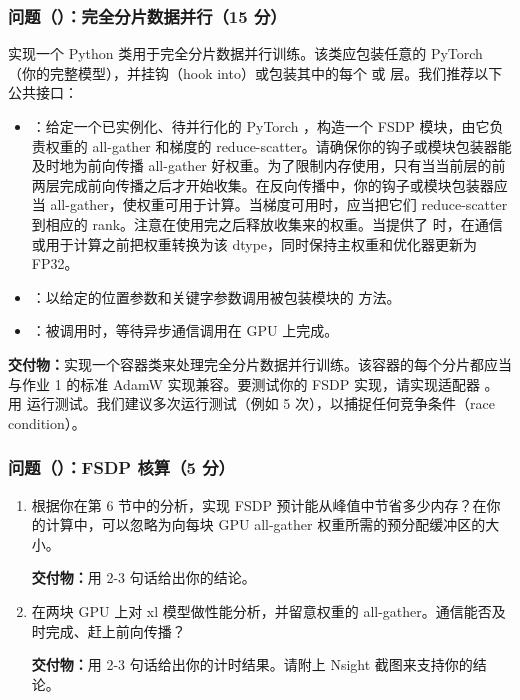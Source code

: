 \subsubsection*{问题（）：完全分片数据并行（15 分）}

实现一个 Python 类用于完全分片数据并行训练。该类应包装任意的 PyTorch （你的完整模型），并挂钩（hook into）或包装其中的每个  或  层。我们推荐以下公共接口：

\begin{itemize}
  \item {}：给定一个已实例化、待并行化的 PyTorch ，构造一个 FSDP 模块，由它负责权重的 all-gather 和梯度的 reduce-scatter。请确保你的钩子或模块包装器能及时地为前向传播 all-gather 好权重。为了限制内存使用，只有当当前层的前两层完成前向传播之后才开始收集。在反向传播中，你的钩子或模块包装器应当 all-gather，使权重可用于计算。当梯度可用时，应当把它们 reduce-scatter 到相应的 rank。注意在使用完之后释放收集来的权重。当提供了  时，在通信或用于计算之前把权重转换为该 dtype，同时保持主权重和优化器更新为 FP32。
  \item {}：以给定的位置参数和关键字参数调用被包装模块的  方法。
  \item {}：被调用时，等待异步通信调用在 GPU 上完成。
\end{itemize}

\textbf{交付物：}实现一个容器类来处理完全分片数据并行训练。该容器的每个分片都应当与作业 1 的标准 AdamW 实现兼容。要测试你的 FSDP 实现，请实现适配器 。用  运行测试。我们建议多次运行测试（例如 5 次），以捕捉任何竞争条件（race condition）。

\subsubsection*{问题（）：FSDP 核算（5 分）}

\begin{enumerate}[label=(\alph*)]
  \item 根据你在第 6 节中的分析，实现 FSDP 预计能从峰值中节省多少内存？在你的计算中，可以忽略为向每块 GPU all-gather 权重所需的预分配缓冲区的大小。

  \textbf{交付物：}用 2-3 句话给出你的结论。

  \item 在两块 GPU 上对 xl 模型做性能分析，并留意权重的 all-gather。通信能否及时完成、赶上前向传播？

  \textbf{交付物：}用 2-3 句话给出你的计时结果。请附上 Nsight 截图来支持你的结论。
\end{enumerate}

